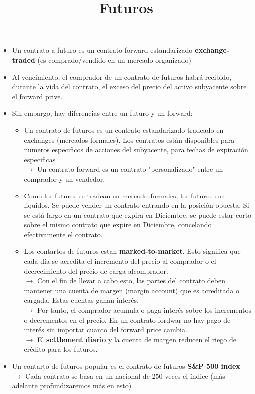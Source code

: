 \documentclass[12pts]{extarticle}
\author{}
\date{}
\title{Futuros}
\begin{document}
\maketitle 
\begin{itemize} 
\item Un contrato a futuro es un contrato forward estandarizado \textbf{exchange-traded} (es comprado/vendido en un mercado organizado) 
\item Al vencimiento, el comprador de un contrato de futuros habrá recibido, durante la vida del contrato, el exceso del precio del activo subyacente sobre el forward prive. 
\item Sin embargo, hay diferencias entre un futuro y un forward: 
\begin{itemize}
\item Un contrato de futuros es un contrato estandarizado tradeado en exchanges (mercados formales). Los contratos están disponibles para numeros  especificos de acciones del subyacente, para fechas de expiración especificas \\ $\rightarrow$ Un contrato forward es un contrato "personalizado" entre un comprador y un vendedor. 
\item Como los futuros se tradean en mercadosformales, los futuros son liquidos. Se puede vender un contrato entrando en la posición opuesta. Si se está largo en un contrato que expira en Diciembre, se puede estar corto sobre el mismo contrato que expire en Diciembre, concelando efectivamente el contrato.
\item Los contartos de futuros estan \textbf{marked-to-market}. Esto significa que cada día se acredita el incremento del precio al comprador o el decrecimiento del precio de carga alcomprador. 
\\ $\rightarrow$ Con el fin de llevar a cabo esto, las partes del contrato deben mantener una cuenta de margen (margin account) que es acreditada o cargada. Estas cuentas ganan interés. 
\\ $\rightarrow$ Por tanto, el comprador acumula o paga interés sobre los incrementos o decrementos en el precio. En un contrato fordwar no hay pago de interés sin importar  cuanto del forward price cambia. 
\\ $\rightarrow$ El \textbf{scttlement diario} y la cuenta de margen reducen el riego de crédito para los futuros. 
\end{itemize}

\item Un contarto de futuros popular es el contrato de futuros \textbf{S\&P 500 index}
\\ $\rightarrow$ Cada contrato se basa en un nacional de 250 veces el índice (más adelante profundizaremos más en esto)
\end{itemize}
\end{document}
